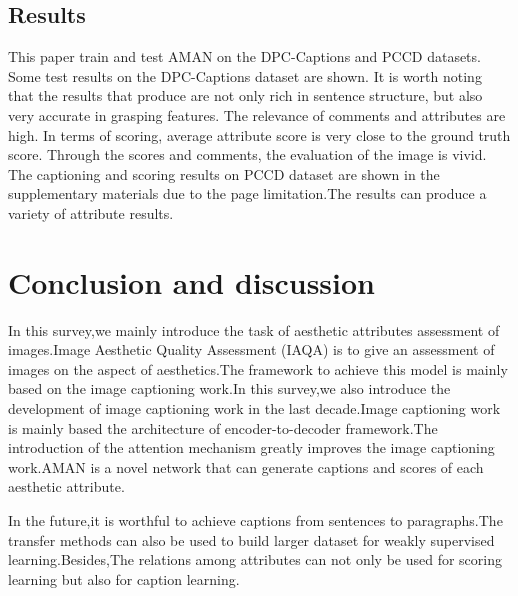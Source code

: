 \documentclass[xelatex,a4j,10pt,twocolumn]{article}
\begin{document}
\subsection{Results}
This paper train and test AMAN on the DPC-Captions and PCCD datasets. Some test results on the DPC-Captions dataset are shown. It is worth noting that the results that produce are not
only rich in sentence structure, but also very accurate in grasping features. The relevance of comments and attributes are high. In terms of scoring, average attribute score is very close to the ground truth score. Through the scores and comments, the evaluation of the image is vivid. The captioning and scoring results on PCCD dataset are shown in the supplementary materials due to the page limitation.The results can produce a variety of attribute results.

\section{Conclusion and discussion}
In this survey,we mainly introduce the task of aesthetic attributes assessment of images.Image Aesthetic Quality Assessment (IAQA) is to give an assessment of images on the aspect of aesthetics.The framework to achieve this model is mainly based on the image captioning work.In this survey,we also introduce the development of image captioning work in the last decade.Image captioning work is mainly based the architecture of encoder-to-decoder framework.The introduction of the attention mechanism greatly improves the image captioning work.AMAN is a novel network that can generate captions and scores of each aesthetic attribute.

In the future,it is worthful to achieve captions from sentences to paragraphs.The transfer methods can also be used to build larger dataset for weakly supervised learning.Besides,The relations among attributes can not only be used for scoring learning but also for caption learning.










\end{document}
